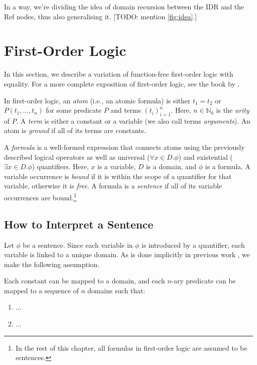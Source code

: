 In a way, we're dividing the idea of domain recursion between the IDR and the Ref nodes, thus also generalising it. [TODO: mention \cref{fig:idea}.]

\section{First-Order Logic}

In this section, we describe a variation of function-free first-order logic with equality. For a more complete exposition of first-order logic, see the book by \cite{DBLP:books/daglib/0023546}.

In first-order logic, an \emph{atom} (i.e., an atomic formula) is either $t_1 = t_2$ or $P(t_1, \dots, t_n)$ for some predicate $P$ and terms $(t_i)_{i=1}^n$. Here, $n \in \mathbb{N}_0$ is the \emph{arity} of $P$. A \emph{term} is either a constant or a variable (we also call terms \emph{arguments}). An atom is \emph{ground} if all of its terms are constants.

A \emph{formula} is a well-formed expression that connects atoms using the previously described logical operators as well as universal ($\forall x \in D. \phi$) and existential ($\exists x \in D. \phi$) quantifiers. Here, $x$ is a variable, $D$ is a domain, and $\phi$ is a formula. A variable occurrence is \emph{bound} if it is within the scope of a quantifier for that variable, otherwise it is \emph{free}. A formula is a \emph{sentence} if all of its variable occurrences are bound.\footnote{In the rest of this chapter, all formulas in first-order logic are assumed to be sentences.}

\subsection{How to Interpret a Sentence}

Let $\phi$ be a sentence. Since each variable in $\phi$ is introduced by a quantifier, each variable is linked to a unique domain. As is done implicitly in previous work \citep{DBLP:phd/basesearch/VandenBroeck13}, we make the following assumption.

\begin{assumption}
  Each constant can be mapped to a domain, and each $n$-ary predicate can be mapped to a sequence of $n$ domains such that:
  \begin{enumerate}
  \item ...
  \item ...
  \end{enumerate}
\end{assumption}

